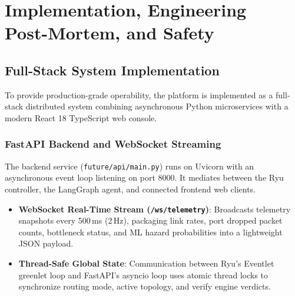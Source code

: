 \chapter{Implementation, Engineering\\Post-Mortem, and Safety}
\label{ch:impl_postmortem}

\section{Full-Stack System Implementation}
To provide production-grade operability, the platform is implemented as a full-stack distributed system combining asynchronous Python microservices with a modern React 18 TypeScript web console.

\subsection{FastAPI Backend and WebSocket Streaming}
The backend service (\texttt{future/api/main.py}) runs on Uvicorn with an asynchronous event loop listening on port 8000. It mediates between the Ryu controller, the LangGraph agent, and connected frontend web clients.
\begin{itemize}[noitemsep,topsep=2pt]
  \item \textbf{WebSocket Real-Time Stream (\texttt{/ws/telemetry})}: Broadcasts telemetry snapshots every 500\,ms (2\,Hz), packaging link rates, port dropped packet counts, bottleneck status, and ML hazard probabilities into a lightweight JSON payload.
  \item \textbf{Thread-Safe Global State}: Communication between Ryu's Eventlet greenlet loop and FastAPI's asyncio loop uses atomic thread locks to synchronize routing mode, active topology, and verify engine verdicts.
\end{itemize}

